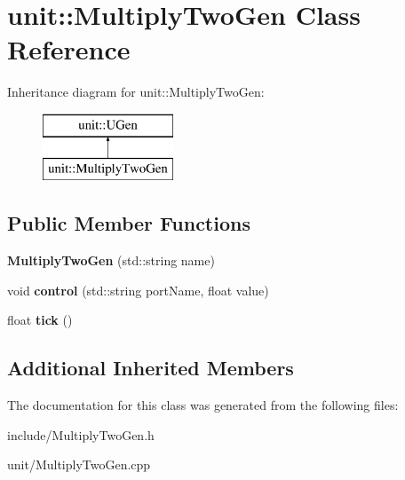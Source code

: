 \hypertarget{classunit_1_1MultiplyTwoGen}{}\section{unit\+:\+:Multiply\+Two\+Gen Class Reference}
\label{classunit_1_1MultiplyTwoGen}
Inheritance diagram for unit\+:\+:Multiply\+Two\+Gen\+:\begin{figure}[H]
\begin{center}
\leavevmode
\includegraphics[height=2.000000cm]{classunit_1_1MultiplyTwoGen}
\end{center}
\end{figure}
\subsection*{Public Member Functions}
\begin{DoxyCompactItemize}
\item 
{\bfseries Multiply\+Two\+Gen} (std\+::string name)\hypertarget{classunit_1_1MultiplyTwoGen_a35e526170e8ac7a43fc19c2a78e14b44}{}\label{classunit_1_1MultiplyTwoGen_a35e526170e8ac7a43fc19c2a78e14b44}

\item 
void {\bfseries control} (std\+::string port\+Name, float value)\hypertarget{classunit_1_1MultiplyTwoGen_af8558651a63c73f27221e99ad03f3242}{}\label{classunit_1_1MultiplyTwoGen_af8558651a63c73f27221e99ad03f3242}

\item 
float {\bfseries tick} ()\hypertarget{classunit_1_1MultiplyTwoGen_a70a07ad9e0f67e6a50aadcdf902db8f3}{}\label{classunit_1_1MultiplyTwoGen_a70a07ad9e0f67e6a50aadcdf902db8f3}

\end{DoxyCompactItemize}
\subsection*{Additional Inherited Members}


The documentation for this class was generated from the following files\+:\begin{DoxyCompactItemize}
\item 
include/Multiply\+Two\+Gen.\+h\item 
unit/Multiply\+Two\+Gen.\+cpp\end{DoxyCompactItemize}
